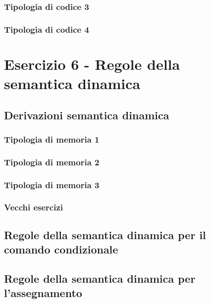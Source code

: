 \documentclass[a4paper]{article}
\begin{document}
	\subsubsection{Tipologia di codice 3}
	
	\subsubsection{Tipologia di codice 4}
	
	\section{Esercizio 6 - Regole della semantica dinamica}
	
	\subsection{Derivazioni semantica dinamica}
	
	\subsubsection{Tipologia di memoria 1}
	
	\subsubsection{Tipologia di memoria 2}
	
	\subsubsection{Tipologia di memoria 3}
	
	\subsubsection{Vecchi esercizi}
	
	\subsection{Regole della semantica dinamica per il comando condizionale}
	
	
	\subsection{Regole della semantica dinamica per l'assegnamento}
	
\end{document}
